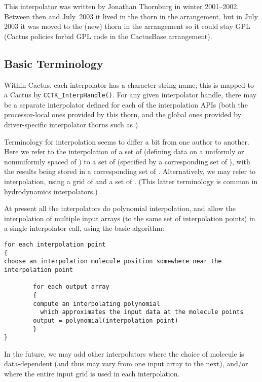 This interpolator was written by Jonathan Thornburg in winter 2001--2002.
Between then and July~2003 it lived in the
 thorn in the  arrangement,
but in July 2003 it was moved to the (new)
 thorn in the  arrangement
so it could stay GPL
(Cactus policies forbid GPL code in the CactusBase arrangement).


\subsection{Basic Terminology}
\label{AEIThorns/AEILocalInterp/sect-basic-terminology}

Within Cactus, each interpolator has a character-string name;
this is mapped to a Cactus  by
\verb|CCTK_InterpHandle()|.  For any given interpolator handle,
there may be a separate interpolator defined for each of the
interpolation APIs (both the processor-local ones provided by this
thorn, and the global ones provided by driver-specific interpolator
thorns such as ).

Terminology for interpolation seems to differ a bit from one author
to another.  Here we refer to the  interpolation
of a set of  (defining data on a uniformly or
nonuniformly spaced  of ) to a set of
 (specified by a corresponding set of
), with the results being stored
in a corresponding set of .  Alternatively,
we may refer to  interpolation, using a grid
of  and a set of .
(This latter terminology is common in hydrodynamics interpolators.)

At present all the interpolators do polynomial interpolation, and
allow the interpolation of multiple input arrays (to the same set of
interpolation points) in a single interpolator call, using the basic
algorithm:
\begin{verbatim}
for each interpolation point
{
choose an interpolation molecule position somewhere near the interpolation point

        for each output array
        {
        compute an interpolating polynomial
          which approximates the input data at the molecule points
        output = polynomial(interpolation point)
        }
}
\end{verbatim}
In the future, we may add other interpolators where the choice of
molecule is data-dependent (and thus may vary from one input array to
the next), and/or where the entire input grid is used in each interpolation.

